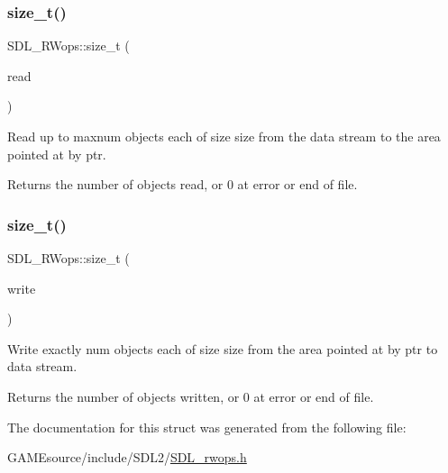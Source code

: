 \subsubsection{\texorpdfstring{size\+\_\+t()}{size\_t()}\hspace{0.1cm}{\footnotesize\ttfamily [1/2]}}
{\footnotesize\ttfamily S\+D\+L\+\_\+\+R\+Wops\+::size\+\_\+t (\begin{DoxyParamCaption}\item[{S\+D\+L\+C\+A\+LL $\ast$}]{read }\end{DoxyParamCaption})}

Read up to {\ttfamily maxnum} objects each of size {\ttfamily size} from the data stream to the area pointed at by {\ttfamily ptr}.

\begin{DoxyReturn}{Returns}
the number of objects read, or 0 at error or end of file. 
\end{DoxyReturn}
\mbox{\label{struct_s_d_l___r_wops_a5f12fd517afffba5bfaff4643d6792b1}} 
\subsubsection{\texorpdfstring{size\+\_\+t()}{size\_t()}\hspace{0.1cm}{\footnotesize\ttfamily [2/2]}}
{\footnotesize\ttfamily S\+D\+L\+\_\+\+R\+Wops\+::size\+\_\+t (\begin{DoxyParamCaption}\item[{S\+D\+L\+C\+A\+LL $\ast$}]{write }\end{DoxyParamCaption})}

Write exactly {\ttfamily num} objects each of size {\ttfamily size} from the area pointed at by {\ttfamily ptr} to data stream.

\begin{DoxyReturn}{Returns}
the number of objects written, or 0 at error or end of file. 
\end{DoxyReturn}


The documentation for this struct was generated from the following file\+:\begin{DoxyCompactItemize}
\item 
G\+A\+M\+Esource/include/\+S\+D\+L2/\mbox{\hyperlink{_s_d_l__rwops_8h}{S\+D\+L\+\_\+rwops.\+h}}\end{DoxyCompactItemize}
